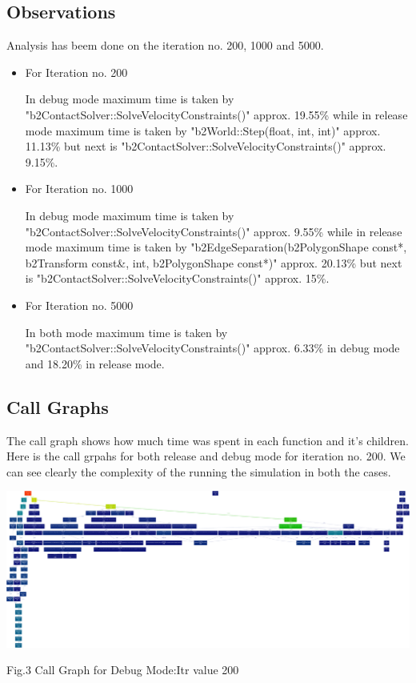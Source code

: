\documentclass[a4paper,11pt]{article}
\begin{document}
\subsection{Observations}
Analysis has beem done on the iteration no. 200, 1000 and 5000.
\begin{itemize}
\item{For Iteration no. 200}
\begin{description} In debug mode maximum time is taken by "b2ContactSolver::SolveVelocityConstraints()" approx. 19.55\% while in release mode maximum time is taken by "b2World::Step(float, int, int)" approx. 11.13\% but next is "b2ContactSolver::SolveVelocityConstraints()" approx. 9.15\%.
\end{description}

\item{For Iteration no. 1000}
\begin{description} In debug mode maximum time is taken by "b2ContactSolver::SolveVelocityConstraints()" approx. 9.55\% while in release mode maximum time is taken by "b2EdgeSeparation(b2PolygonShape const*, b2Transform const\&, int, b2PolygonShape const*)" approx. 20.13\% but next is "b2ContactSolver::SolveVelocityConstraints()" approx. 15\%.
\end{description}

\item{For Iteration no. 5000}
\begin{description} In both mode maximum time is taken by "b2ContactSolver::SolveVelocityConstraints()" approx. 6.33\% in debug mode and 18.20\% in release mode.
\end{description}

\end{itemize}

\subsection{Call Graphs}
The call graph shows how much time was spent in each function and it’s children. Here is the call grpahs for both release and debug mode for iteration no. 200. We can see clearly the complexity of the running the simulation in both the cases.

\begin{center}
\includegraphics[scale=0.1]{./doc/deb_output200.png}
\begin{center}
Fig.3 Call Graph for Debug Mode:Itr value 200
\end{center}
\end{center}
\end{document}
